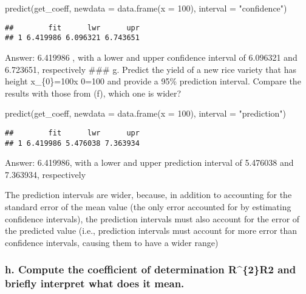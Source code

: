 \documentclass[
]{article}
\newenvironment{Shaded}{\begin{snugshade}}{\end{snugshade}}
\newcommand{\AttributeTok}[1]{\textcolor[rgb]{0.77,0.63,0.00}{#1}}
\newcommand{\DecValTok}[1]{\textcolor[rgb]{0.00,0.00,0.81}{#1}}
\newcommand{\FunctionTok}[1]{\textcolor[rgb]{0.00,0.00,0.00}{#1}}
\newcommand{\NormalTok}[1]{#1}
\newcommand{\StringTok}[1]{\textcolor[rgb]{0.31,0.60,0.02}{#1}}
\begin{document}
\begin{Shaded}
\begin{Highlighting}[]
\FunctionTok{predict}\NormalTok{(get\_coeff, }\AttributeTok{newdata =} \FunctionTok{data.frame}\NormalTok{(}\AttributeTok{x =} \DecValTok{100}\NormalTok{), }\AttributeTok{interval =} \StringTok{"confidence"}\NormalTok{)}
\end{Highlighting}
\end{Shaded}

\begin{verbatim}
##        fit      lwr      upr
## 1 6.419986 6.096321 6.743651
\end{verbatim}

Answer: 6.419986 , with a lower and upper confidence interval of
6.096321 and 6.723651, respectively \#\#\# g. Predict the yield of a new
rice variety that has height x\_\{0\}=100x 0=100 and provide a 95\%
prediction interval. Compare the results with those from (f), which one
is wider?

\begin{Shaded}
\begin{Highlighting}[]
\FunctionTok{predict}\NormalTok{(get\_coeff, }\AttributeTok{newdata =} \FunctionTok{data.frame}\NormalTok{(}\AttributeTok{x =} \DecValTok{100}\NormalTok{), }\AttributeTok{interval =} \StringTok{"prediction"}\NormalTok{)}
\end{Highlighting}
\end{Shaded}

\begin{verbatim}
##        fit      lwr      upr
## 1 6.419986 5.476038 7.363934
\end{verbatim}

Answer: 6.419986, with a lower and upper prediction interval of 5.476038
and 7.363934, respectively

The prediction intervals are wider, because, in addition to accounting
for the standard error of the mean value (the only error accounted for
by estimating confidence intervals), the prediction intervals must also
account for the error of the predicted value (i.e., prediction intervals
must account for more error than confidence intervals, causing them to
have a wider range)

\hypertarget{h.-compute-the-coefficient-of-determination-r2r2-and-briefly-interpret-what-does-it-mean.}{%
\subsubsection{h. Compute the coefficient of determination R\^{}\{2\}R2
and briefly interpret what does it
mean.}\label{h.-compute-the-coefficient-of-determination-r2r2-and-briefly-interpret-what-does-it-mean.}}
\end{document}
